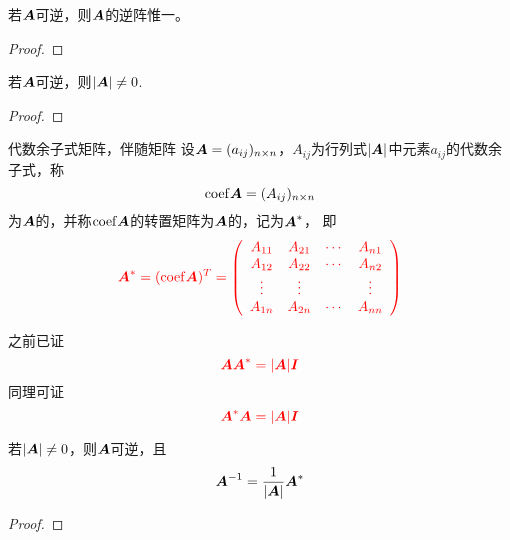 \begin{frame}

\begin{dingli}
  若$\boldsymbol{A}$可逆，则$\boldsymbol{A}$的逆阵惟一。
\end{dingli}

\begin{proof}
\end{proof}
\end{frame}

\begin{frame}


\end{frame}

\begin{frame}

\begin{dingli}
  若$\boldsymbol{A}$可逆，则$|\boldsymbol{A}|\ne 0$.
\end{dingli}
\begin{proof}

\end{proof}
\end{frame}

\begin{frame}
\begin{dingyi}{代数余子式矩阵，伴随矩阵}
  设$\boldsymbol{A}=(a_{ij})_{n\times n}$，$A_{ij}$为行列式$|\boldsymbol{A}|$中元素$a_{ij}$的代数余子式，称
  $$
  \mathrm{coef} \boldsymbol{A} = (A_{ij})_{n\times n}
  $$
  为$\boldsymbol{A}$的，并称$\mathrm{coef} \boldsymbol{A}$的转置矩阵为$\boldsymbol{A}$的，记为$\boldsymbol{A}^*$，
  即
  $$\textcolor{red}{
    \boldsymbol{A}^* = (\mathrm{coef}\boldsymbol{A})^T = \left(
      \begin{array}{cccc}
        A_{11} & A_{21} & \cdots & A_{n1} \\
        A_{12} & A_{22} & \cdots & A_{n2} \\
        \vdots   & \vdots   &     & \vdots   \\
        A_{1n} & A_{2n} & \cdots & A_{nn} \\
      \end{array}
    \right)
  }
  $$
\end{dingyi}
\end{frame}

\begin{frame}
之前已证
$$ \textcolor{red}{
  \boldsymbol{A}\boldsymbol{A}^* = |\boldsymbol{A}|\boldsymbol{I}
}
$$
同理可证
$$ \textcolor{red}{
  \boldsymbol{A}^*\boldsymbol{A} = |\boldsymbol{A}|\boldsymbol{I}
}
$$

\end{frame}

\begin{frame}
\begin{dingli}
  若$|\boldsymbol{A}|\ne 0$，则$\boldsymbol{A}$可逆，且
  $$
  \boldsymbol{A}^{-1} = \frac1{|\boldsymbol{A}|} \boldsymbol{A}^*
  $$
\end{dingli}

\begin{proof}

\end{proof} \pause 

\end{frame}

